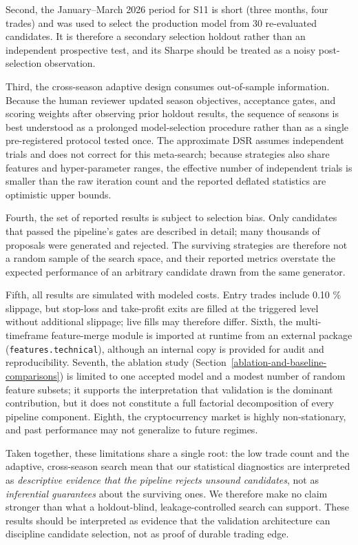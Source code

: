 \documentclass[analytics,article,submit,pdftex,moreauthors]{Definitions/mdpi}
\begin{document}
Second, the January--March 2026 period for S11 is short (three months, four trades) and was used to select the production model from 30 re-evaluated candidates. It is therefore a secondary selection holdout rather than an independent prospective test, and its Sharpe should be treated as a noisy post-selection observation.

Third, the cross-season adaptive design consumes out-of-sample information. Because the human reviewer updated season objectives, acceptance gates, and scoring weights after observing prior holdout results, the sequence of seasons is best understood as a prolonged model-selection procedure rather than as a single pre-registered protocol tested once. The approximate DSR assumes independent trials and does not correct for this meta-search; because strategies also share features and hyper-parameter ranges, the effective number of independent trials is smaller than the raw iteration count and the reported deflated statistics are optimistic upper bounds.

Fourth, the set of reported results is subject to selection bias. Only candidates that passed the pipeline's gates are described in detail; many thousands of proposals were generated and rejected. The surviving strategies are therefore not a random sample of the search space, and their reported metrics overstate the expected performance of an arbitrary candidate drawn from the same generator.

Fifth, all results are simulated with modeled costs. Entry trades include 0.10 \% slippage, but stop-loss and take-profit exits are filled at the triggered level without additional slippage; live fills may therefore differ. Sixth, the multi-timeframe feature-merge module is imported at runtime from an external package (\texttt{features.technical}), although an internal copy is provided for audit and reproducibility. Seventh, the ablation study (Section~\ref{ablation-and-baseline-comparisons}) is limited to one accepted model and a modest number of random feature subsets; it supports the interpretation that validation is the dominant contribution, but it does not constitute a full factorial decomposition of every pipeline component. Eighth, the cryptocurrency market is highly non-stationary, and past performance may not generalize to future regimes.

Taken together, these limitations share a single root: the low trade count and the adaptive, cross-season search mean that our statistical diagnostics are interpreted as \emph{descriptive evidence that the pipeline rejects unsound candidates}, not as \emph{inferential guarantees} about the surviving ones. We therefore make no claim stronger than what a holdout-blind, leakage-controlled search can support. These results should be interpreted as evidence that the validation architecture can discipline candidate selection, not as proof of durable trading edge.
\end{document}
